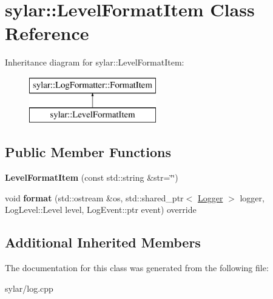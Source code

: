 \hypertarget{classsylar_1_1LevelFormatItem}{\section{sylar\-:\-:Level\-Format\-Item Class Reference}
\label{classsylar_1_1LevelFormatItem}
}
Inheritance diagram for sylar\-:\-:Level\-Format\-Item\-:\begin{figure}[H]
\begin{center}
\leavevmode
\includegraphics[height=2.000000cm]{classsylar_1_1LevelFormatItem}
\end{center}
\end{figure}
\subsection*{Public Member Functions}
\begin{DoxyCompactItemize}
\item 
\hypertarget{classsylar_1_1LevelFormatItem_aaf1f3a026a5bee9c27c54b7f367e8129}{{\bfseries Level\-Format\-Item} (const std\-::string \&str=\char`\"{}\char`\"{})}\label{classsylar_1_1LevelFormatItem_aaf1f3a026a5bee9c27c54b7f367e8129}

\item 
\hypertarget{classsylar_1_1LevelFormatItem_ac040a11f4eec0644a4b5c1e4c9ffa0b1}{void {\bfseries format} (std\-::ostream \&os, std\-::shared\-\_\-ptr$<$ \hyperlink{classsylar_1_1Logger}{Logger} $>$ logger, Log\-Level\-::\-Level level, Log\-Event\-::ptr event) override}\label{classsylar_1_1LevelFormatItem_ac040a11f4eec0644a4b5c1e4c9ffa0b1}

\end{DoxyCompactItemize}
\subsection*{Additional Inherited Members}


The documentation for this class was generated from the following file\-:\begin{DoxyCompactItemize}
\item 
sylar/log.\-cpp\end{DoxyCompactItemize}
